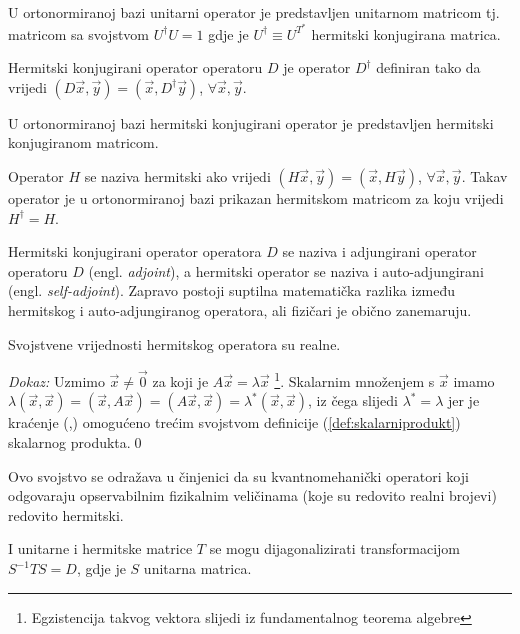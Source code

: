 U ortonormiranoj bazi unitarni operator je predstavljen unitarnom
 matricom tj. matricom sa svojstvom $U^{\dagger}U=1$ gdje je
$U^{\dagger}\equiv U^{T^*}$ hermitski konjugirana matrica.


\begin{definicija}
Hermitski konjugirani operator operatoru $D$ je operator $D^\dagger$
definiran tako da vrijedi $(D\vec{x}, \vec{y})
=(\vec{x}, D^\dagger \vec{y})$, $\forall \vec{x}, \vec{y}$.
\end{definicija}

U ortonormiranoj bazi hermitski konjugirani operator je predstavljen
hermitski konjugiranom matricom.

\begin{definicija}
Operator $H$ se naziva hermitski ako vrijedi $(H\vec{x}, \vec{y})
=(\vec{x}, H \vec{y})$, $\forall \vec{x}, \vec{y}$. Takav operator
je u ortonormiranoj bazi prikazan hermitskom matricom za koju
vrijedi $H^\dagger = H$.
\end{definicija}

Hermitski konjugirani operator operatora $D$ se naziva i 
adjungirani operator operatoru $D$ (engl. \emph{adjoint}), a hermitski
operator se naziva i auto-adjungirani (engl. \emph{self-adjoint}).
Zapravo postoji suptilna matematička razlika između hermitskog
i auto-adjungiranog operatora, ali fizičari je obično zanemaruju.

\begin{teorem}
Svojstvene vrijednosti hermitskog operatora su realne.
\end{teorem}

\emph{Dokaz:} Uzmimo $\vec{x}\neq \vec{0}$ za koji je $A \vec{x} = \lambda \vec{x}$%
\footnote{Egzistencija takvog vektora slijedi iz fundamentalnog teorema algebre}.
Skalarnim množenjem s $\vec{x}$ imamo $\lambda(\vec{x}, \vec{x}) =
(\vec{x}, A\vec{x}) = (A\vec{x},\vec{x}) = \lambda^{\ast}(\vec{x},\vec{x})$,
iz čega slijedi $\lambda^{\ast}=\lambda$ jer je kraćenje (,)
omogućeno trećim svojstvom definicije (\ref{def:skalarniprodukt})
skalarnog produkta.\qed

Ovo svojstvo se odražava u činjenici da su kvantnomehanički operatori koji
odgovaraju opservabilnim fizikalnim veličinama (koje su redovito realni
brojevi) redovito hermitski.

I unitarne i hermitske matrice $T$ se mogu dijagonalizirati transformacijom
$S^{-1} T S = D$, gdje je $S$ unitarna matrica.

